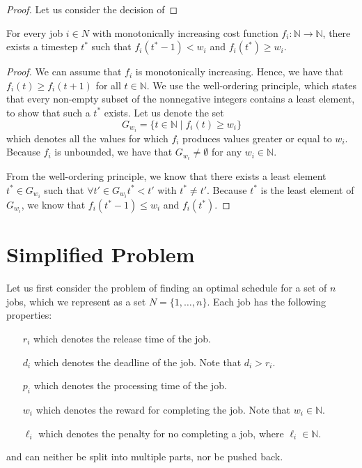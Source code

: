 \begin{proof}

    Let us consider the decision of 

\end{proof}

\begin{theorem}
    For every job $i\in N$ with monotonically increasing cost function $f_i: \mathbb{N} \rightarrow \mathbb{N}$, there exists a timestep $t^*$ such that $f_i(t^*-1) < w_i$ and $f_i(t^*) \geq w_i$.  
\end{theorem}

\begin{proof}

We can assume that $f_i$ is monotonically increasing. Hence, we have that $f_i(t) \geq f_i(t+1)$ for all $t\in \mathbb{N}$.
We use the well-ordering principle, which states that every non-empty subset of the nonnegative integers contains a least element, to show that such a $t^*$ exists. Let us denote the set 
\begin{equation}
    G_{w_i} = \{t\in \mathbb{N} \mid f_i(t) \geq w_i\}
\end{equation}
which denotes all the values for which $f_i$ produces values greater or equal to $w_i$. 
Because $f_i$ is unbounded, we have that $G_{w_i} \neq \emptyset$ for any $w_i \in \mathbb{N}$.

From the well-ordering principle, we know that there exists a least element $t^* \in G_{w_i}$ such that $\forall t' \in G_{w_i} t^* < t'$ with $t^* \neq t'$.
Because $t^*$ is the least element of $G_{w_i}$, we know that $f_i(t^* - 1) \leq w_i$ and $f_i (t^*)$.

\end{proof}

\section{Simplified Problem}

Let us first consider the problem of finding an optimal schedule for a set of $n$ jobs, which we represent as a set $N = \{1, \dots, n\}$.
Each job has the following properties:
\begin{itemize}
    \item[$r_i$] which denotes the release time of the job.
    \item[$d_i$] which denotes the deadline of the job. Note that $d_i > r_i$.
    \item[$p_i$] which denotes the processing time of the job.
    \item[$w_i$] which denotes the reward for completing the job. Note that $w_i\in \mathbb{N}$.
    \item[$\ell_i$] which denotes the penalty for no completing a job, where $\ell_i \in \mathbb{N}$.   
\end{itemize}
and can neither be split into multiple parts, nor be pushed back.

